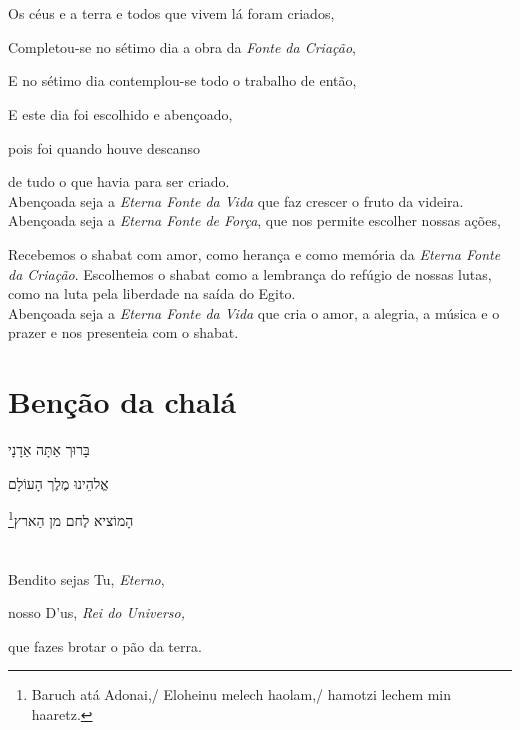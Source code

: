 \movetooddpage
\raggedright

\section{}

Os céus e a terra e todos que vivem lá foram criados,

Completou-se no sétimo dia a obra da \emph{Fonte da Criação},

E no sétimo dia contemplou-se todo o trabalho de \qb{}então,

E este dia foi escolhido e abençoado,

pois foi quando houve descanso

de tudo o que havia para ser criado.\\[10pt]

Abençoada seja a \emph{Eterna Fonte da Vida} que faz crescer \qb{}o fruto da videira.\\[10pt]

Abençoada seja a \emph{Eterna Fonte de Força}, que nos \qb{}permite escolher nossas ações,

Recebemos o shabat com amor, como herança e como memória da \emph{Eterna
Fonte da Criação}. Escolhemos o shabat como a lembrança do refúgio de
nossas lutas, como na luta pela liberdade na saída do Egito.\\[10pt]

Abençoada seja a \emph{Eterna Fonte da Vida} que cria o amor, a alegria,
a música e o prazer e nos presenteia com o shabat.

\movetoevenpage
\raggedleft

\section{Benção da chalá}

בָּרוּך אַתָּה אַדָנָי

אֱלהֵינוּ מֶלֶך הָעוֹלָם

הָמוֹציא לֶחם מן הַארץ\footnote{Baruch atá Adonai,/ Eloheinu melech haolam,/ hamotzi lechem min haaretz.}

\movetooddpage
\raggedright

\section{}

Bendito sejas Tu, \emph{Eterno},

nosso D'us, \emph{Rei do Universo,}

que fazes brotar o pão da terra.
